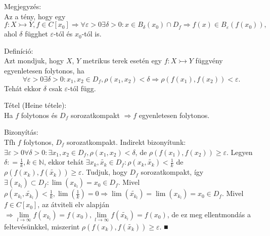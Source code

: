 \documentclass[12pt,a4paper]{scrartcl}
\newenvironment{definicio}{}{}
\newenvironment{tetel}{}{}
\newenvironment{bizonyitas}{}{}
\newenvironment{megjegyzes}{}{}
\begin{document}
\begin{megjegyzes}

Megjegyzés:\\
Az a tény, hogy egy
\[\left. f:X\rightarrowtail Y,f \in C\left\lbrack x_{0} \right\rbrack\Rightarrow\forall\varepsilon > 0\exists\delta > 0:x \in B_{\delta}\left( x_{0} \right) \cap D_{f}\Rightarrow f\left( x \right) \in B_{\varepsilon}{\left( {f\left( x_{0} \right)} \right),} \right.\]
ahol \(\delta\) függhet \(\varepsilon\)-tól és \(x_{0}\)-tól is.

\end{megjegyzes}

\begin{definicio}

Definíció:\\
Azt mondjuk, hogy \(X\), \(Y\) metrikus terek esetén egy
\(\left. f:X\rightarrowtail Y \right.\) függvény egyenletesen folytonos,
ha
\[\left. \forall\varepsilon > 0\exists\delta > 0:x_{1},x_{2} \in D_{f},\rho\left( {x_{1},x_{2}} \right) < \delta\Rightarrow\rho\left( {f\left( x_{1} \right),f\left( x_{2} \right)} \right) < \varepsilon. \right.\]
Tehát ekkor \(\delta\) csak \(\varepsilon\)-tól függ.

\end{definicio}

\begin{tetel}

Tétel (Heine tétele):\\
Ha \(f\) folytonos és \(D_{f}\) sorozatkompakt
\(\left. \Rightarrow f \right.\) egyenletesen folytonos.

\end{tetel}

\begin{bizonyitas}

Bizonyítás:\\
Tfh \(f\) folytonos, \(D_{f}\) sorozatkompakt. Indirekt bizonyítunk:
\(\exists\varepsilon > 0\forall\delta > 0:\exists x_{1},x_{2} \in D_{f},\rho\left( {x_{1},x_{2}} \right) < \delta\),
de
\(\rho\left( {f\left( x_{1} \right),f\left( x_{2} \right)} \right) \geq \varepsilon\).
Legyen \(\delta: = \frac{1}{k},k \in {\mathbb{N}}\), ekkor tehát
\(\exists x_{k},\widetilde{x_{k}} \in D_{f}:\rho\left( {x_{k},\widetilde{x_{k}}} \right) < \frac{1}{k}\)
de
\(\rho\left( {f\left( x_{k} \right),f\left( \widetilde{x_{k}} \right)} \right) \geq \varepsilon\).
Tudjuk, hogy \(D_{f}\) sorozatkompakt, így
\(\exists\left( x_{k_{l}} \right) \subset D_{f}:\lim\left( x_{k_{l}} \right) = x_{0} \in D_{f}\).
Mivel
\(\left. \rho\left( {x_{k_{l}},\widetilde{x_{k_{l}}}} \right) < \frac{1}{k},\lim\left( \frac{1}{k} \right) = 0\Rightarrow\lim\left( \widetilde{x_{k_{l}}} \right) = \lim\left( x_{k_{l}} \right) = x_{0} \in D_{f} \right.\).
Mivel \(f \in C\left\lbrack x_{0} \right\rbrack\), az átviteli elv
alapján
\(\left. \Rightarrow\underset{l\rightarrow\infty}{\lim}f\left( x_{k_{l}} \right) = f\left( x_{0} \right),\underset{l\rightarrow\infty}{\lim}f\left( \widetilde{x_{k_{l}}} \right) = f\left( x_{0} \right) \right.\),
de ez meg ellentmondás a feltevésünkkel, miszerint
\(\rho\left( {f\left( x_{k} \right),f\left( \widetilde{x_{k}} \right)} \right) \geq \varepsilon\).
■

\end{bizonyitas}
\end{document}
